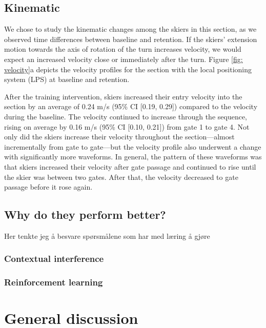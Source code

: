 \documentclass{report}
\begin{document}
\subsection{Kinematic}
We chose to study the kinematic changes among the skiers in this section, as we observed time differences between baseline and retention. If the skiers' extension motion towards the axis of rotation of the turn increases velocity, we would expect an increased velocity close or immediately after the turn. Figure \ref{fig: velocity}a depicts the velocity profiles for the section with the local positioning system (LPS) at baseline and retention.  

After the training intervention, skiers increased their entry velocity into the section by an average of 0.24 m/s (95\% CI [0.19, 0.29]) compared to the velocity during the baseline. The velocity continued to increase through the sequence, rising on average by 0.16 m/s (95\% CI [0.10, 0.21]) from gate 1 to gate 4. Not only did the skiers increase their velocity throughout the section—almost incrementally from gate to gate—but the velocity profile also underwent a change with significantly more waveforms. In general, the pattern of these waveforms was that skiers increased their velocity after gate passage and continued to rise until the skier was between two gates. After that, the velocity decreased to gate passage before it rose again. 




\subsection{Why do they perform better?}
Her tenkte jeg å besvare spørsmålene som har med læring å gjøre

\subsubsection{Contextual interference}

\subsubsection{Reinforcement learning}







\section{General discussion}


\printbibliography
\end{document}
